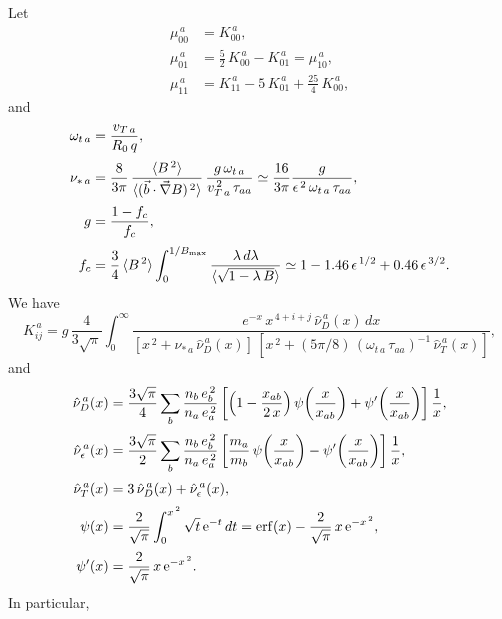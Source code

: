 \documentclass[12pt]{article}
\begin{document}
Let
\begin{align}
\mu_{00}^{\,a} &= K_{00}^{\,a},\\[0.5ex]
\mu_{01}^{\,a} &= \frac{5}{2}\,K_{00}^{\,a}- K_{01}^{\,a}=\mu_{10}^{\,a},\\[0.5ex]
\mu_{11}^{\,a} &= K_{11}^{\,a} - 5\,K_{01}^{\,a}+\frac{25}{4}\,K_{00}^{\,a},
\end{align}
and
\begin{align}
\omega_{t\,a} &=\frac{v_{T\,a}}{R_0\,q},\\[0.5ex]
\nu_{\ast\,a}&= \frac{8}{3\pi}\,\frac{\langle B^{\,2}\rangle}{\langle (\vec{b}\cdot\vec{\nabla}B)^{\,2}\rangle}\,\frac{g\,\omega_{t\,a}}{v_{T\,a}^{\,2}\,\tau_{aa}}\simeq \frac{16}{3\pi}\frac{g}{\epsilon^{\,2}\,\omega_{t\,a}\,\tau_{aa}},\\[0.5ex]
g &= \frac{1-f_c}{f_c},\\[0.5ex]
f_c &= \frac{3}{4}\,\langle B^{\,2}\rangle\int_{0}^{1/B_{\rm max}}\frac{\lambda\,d\lambda}{\langle\sqrt{1-\lambda\,B}\rangle}\simeq 1-1.46\,\epsilon^{\,1/2}+0.46\,\epsilon^{\,3/2}.
\end{align}
We have
\begin{equation}
K_{ij}^{\,a} = g\,\frac{4}{3\sqrt{\pi}}\int_0^\infty
\frac{e^{-x}\,x^{\,4+i+j}\,\hat{\nu}_D^{\,a}(x)\,dx}{[x^{\,2}+\nu_{\ast\,a}\,\hat{\nu}_D^{\,a}(x)]\,[x^{\,2}+(5\pi/8)\,(\omega_{t\,a}\,\tau_{aa})^{-1}\,\hat{\nu}_T^{\,a}(x)]},
\end{equation}
and 
\begin{align}
\hat{\nu}_D^{\,a}(x)&=\frac{3\sqrt{\pi}}{4}\sum_b 
\frac{n_b\,e_b^{\,2}}{n_a\,e_a^{\,2}}\left[\left(1-\frac{x_{ab}}{2\,x}\right)\psi\!\left(\frac{x}{x_{ab}}\right)
+\psi'\!\left(\frac{x}{x_{ab}}\right)\right]\frac{1}{x},\\[0.5ex]
\hat{\nu}_\epsilon^{\,a}(x)&=\frac{3\sqrt{\pi}}{2}\sum_b 
\frac{n_b\,e_b^{\,2}}{n_a\,e_a^{\,2}}\left[\frac{m_a}{m_b}\,\psi\!\left(\frac{x}{x_{ab}}\right)
-\psi'\!\left(\frac{x}{x_{ab}}\right)\right]\frac{1}{x},\\[0.5ex]
\hat{\nu}_T^{\,a}(x) &= 3\,\hat{\nu}_D^{\,a}(x)+\hat{\nu}_{\epsilon}^{\,a}(x),\\[0.5ex]
\psi(x) &=\frac{2}{\sqrt{\pi}}\int_0^{x^{\,2}}\sqrt{t}\,{\rm e}^{-t}\,dt = {\rm erf}(x)-\frac{2}{\sqrt{\pi}}\,x\,{\rm e}^{-x^{\,2}},\\[0.5ex]
\psi'(x)&= \frac{2}{\sqrt{\pi}}\,x\,{\rm e}^{-x^{\,2}}.
\end{align}
In particular,
\end{document}
